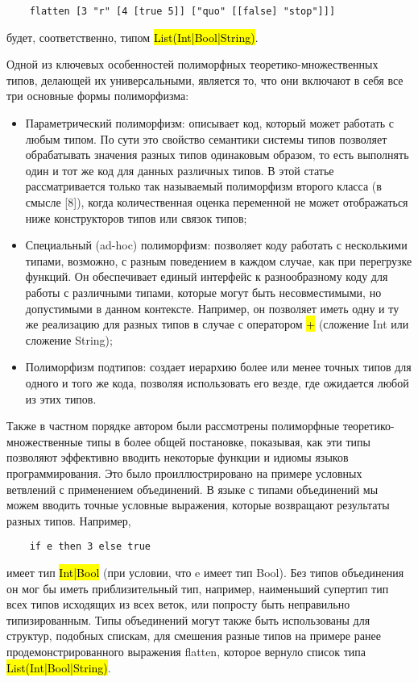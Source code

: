 \begin{lstlisting}
    flatten [3 "r" [4 [true 5]] ["quo" [[false] "stop"]]]
\end{lstlisting}
будет, соответственно, типом \hl{List(Int|Bool|String)}.

Одной из ключевых особенностей полиморфных теоретико-множественных типов, делающей их универсальными, является то, что
они включают в себя все три основные формы полиморфизма:

\begin{itemize}[left=2em]
    \item Параметрический полиморфизм: описывает код, который может работать с любым типом.
    По сути это свойство семантики системы типов позволяет обрабатывать значения разных типов одинаковым образом,
    то есть выполнять один и тот же код для данных различных типов.
    В этой статье рассматривается только так называемый полиморфизм второго класса (в смысле [8]), когда количественная
    оценка переменной не может отображаться ниже конструкторов типов или связок типов;
    \item Специальный (ad-hoc) полиморфизм: позволяет коду работать с несколькими типами, возможно, с разным поведением
    в каждом случае, как при перегрузке функций.
    Он обеспечивает единый интерфейс к разнообразному коду для работы с различными типами,
    которые могут быть несовместимыми, но допустимыми в данном контексте.
    Например, он позволяет иметь одну и ту же реализацию для разных типов в случае с оператором \hl{+}
    (сложение Int или сложение String);
    \item Полиморфизм подтипов: создает иерархию более или менее точных типов для одного и того же кода, позволяя
    использовать его везде, где ожидается любой из этих типов.
\end{itemize}

Также в частном порядке автором были рассмотрены полиморфные теоретико-множественные типы в более общей постановке,
показывая, как эти типы позволяют эффективно вводить некоторые функции и идиомы языков программирования.
Это было проиллюстрировано на примере условных ветвлений с применением объединений.
В языке с типами объединений мы можем вводить точные условные выражения, которые возвращают результаты разных типов.
Например,

\begin{lstlisting}
    if e then 3 else true
\end{lstlisting}
имеет тип \hl{Int|Bool} (при условии, что e имеет тип Bool).
Без типов объединения он мог бы иметь приблизительный тип, например, наименьший супертип тип всех типов исходящих из
всех веток, или попросту быть неправильно типизированным.
Типы объединений могут также быть использованы для структур, подобных спискам, для смешения разные типов на примере
ранее продемонстрированного выражения flatten, которое вернуло список типа \hl{List(Int|Bool|String)}.

